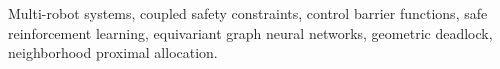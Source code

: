 \documentclass[journal]{IEEEtran}
\begin{document}
\begin{IEEEkeywords}
Multi-robot systems, coupled safety constraints, control barrier functions, safe reinforcement learning, equivariant graph neural networks, geometric deadlock, neighborhood proximal allocation.
\end{IEEEkeywords}









\end{document}
